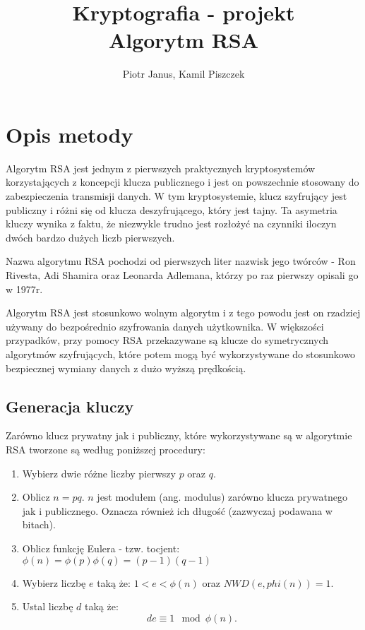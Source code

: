 \documentclass[10pt,a4paper]{article}
\begin{document}
	\title{Kryptografia - projekt  \\  Algorytm RSA}
	\author{Piotr Janus, Kamil Piszczek}
	\date{}
	\maketitle

\section{Opis metody}
Algorytm RSA jest jednym z pierwszych praktycznych kryptosystemów korzystających z koncepcji klucza publicznego i jest on powszechnie stosowany do zabezpieczenia transmisji danych. W tym kryptosystemie, klucz szyfrujący jest publiczny i różni się od klucza deszyfrującego, który jest tajny. Ta asymetria kluczy wynika z faktu, że niezwykle trudno jest rozłożyć na czynniki iloczyn dwóch bardzo dużych liczb pierwszych. 

Nazwa algorytmu RSA pochodzi od pierwszych liter nazwisk jego twórców - Ron Rivesta, Adi Shamira oraz Leonarda Adlemana, którzy po raz pierwszy opisali go w 1977r.

Algorytm RSA jest stosunkowo wolnym algorytm i z tego powodu jest on rzadziej używany do bezpośrednio szyfrowania danych użytkownika. W większości przypadków, przy pomocy RSA przekazywane są klucze do symetrycznych algorytmów szyfrujących, które potem mogą być wykorzystywane do stosunkowo bezpiecznej wymiany danych z dużo wyższą prędkością.

\subsection{Generacja kluczy} \label{key_gen}

Zarówno klucz prywatny jak i publiczny, które wykorzystywane są w algorytmie RSA tworzone są według poniższej procedury:

\begin{enumerate}
\item Wybierz dwie różne liczby pierwszy $p$ oraz $q$.
\item Oblicz $n = pq$. $n$ jest modułem (ang. modulus) zarówno klucza prywatnego jak i publicznego. Oznacza również ich długość (zazwyczaj podawana w bitach).
\item Oblicz funkcję Eulera - tzw. tocjent: $\phi(n) = \phi(p) \phi(q) = (p-1)(q-1)$
\item Wybierz liczbę $e$ taką że: $1<e<\phi(n)$ oraz $NWD(e,phi(n))=1$.
\item Ustal liczbę $d$ taką że:
\begin{equation} \label{ed_cond_eq}
d e \equiv 1 \mod \phi(n).
\end{equation}
\end{enumerate}
\end{document}
